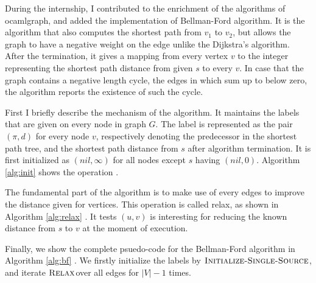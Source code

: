 \documentclass[a4paper,12pt]{article}
\begin{document}
During the internship, I contributed to the enrichment of the
algorithms of ocamlgraph, and added the implementation of Bellman-Ford
algorithm. It is the algorithm that also computes the shortest path
from $v_1$ to $v_2$, but allows the graph to have a negative weight on
the edge unlike the Dijkstra's algorithm. After the termination, it
gives a mapping from every vertex $v$ to the integer representing the
shortest path distance from given $s$ to every $v$. In case that the
graph contains a negative length cycle, the edges in which sum up to
below zero, the algorithm reports the existence of such the cycle.

First I briefly describe the mechanism of the algorithm. It maintains
the labels that are given on every node in graph $G$. The label is
represented as the pair $(\pi,d)$ for every node $v$, respectively
denoting the predecessor in the shortest path tree, and the shortest
path distance from $s$ after algorithm termination. It is first
initialized as $(nil,\infty)$ for all nodes except $s$ having
$(nil,0)$. Algorithm \ref{alg:init} shows the operation \cite{algo}.

\newcommand{\initBF}{\ensuremath{\mbox{\sc Initialize-Single-Source}}}
\begin{algorithm}
\caption{$\initBF(G,s)$}\label{alg:init}
\begin{algorithmic}[1]
\ENDFOR
{}
\end{algorithmic}
\end{algorithm}

The fundamental part of the algorithm is to make use of every edges to
improve the distance given for vertices. This operation is called
relax, as shown in Algorithm \ref{alg:relax} \cite{algo}. It tests
$(u,v)$ is interesting for reducing the known distance from $s$ to $v$
at the moment of execution.

\newcommand{\relaxBF}{\ensuremath{\mbox{\sc Relax}}}
\begin{algorithm}
\caption{$\relaxBF(u,v,l)$}\label{alg:relax}
\begin{algorithmic}[1]
\ENDIF
\end{algorithmic}
\end{algorithm}

Finally, we show the complete psuedo-code for the Bellman-Ford
algorithm in Algorithm \ref{alg:bf} \cite{algo}. We firstly initialize
the labels by \initBF, and iterate \relaxBF over all edges for $|V|-1$
times.
\end{document}
